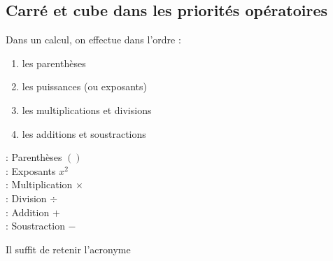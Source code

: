 \subsection{Carré et cube dans les priorités opératoires}
\begin{convention}
    \begin{minipage}{0.58\textwidth}
    Dans un calcul, on effectue dans l'ordre : 
    \begin{enumerate}
        \item les parenthèses
        \item les puissances (ou exposants)
        \item les multiplications et divisions
        \item les additions et soustractions
    \end{enumerate}
    \end{minipage}
    \hfill
    \vline
    \hfill
    \begin{minipage}{0.38\textwidth}
        \textcolor{Jaune}{ : Parenthèses $()$}\\
        \textcolor{Vert}{ : Exposants $x^2$}\\
        \textcolor{Rouge}{ : Multiplication $\times$}\\
        \textcolor{Rouge}{ : Division $\div$ }\\
        \textcolor{Bleu}{ : Addition $+$}\\
        \textcolor{Bleu}{ : Soustraction $-$}
    \end{minipage}
    \newline
    \newline
    \newline
    Il suffit de retenir l'acronyme 
\end{convention}




